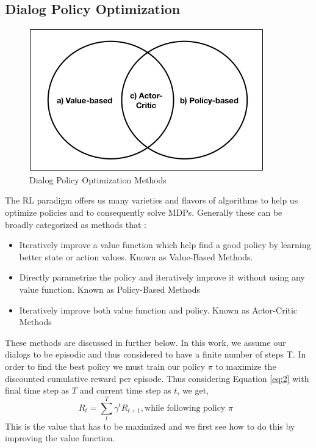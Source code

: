 \documentclass[14pt]{extarticle}
\numberwithin{equation}{section}
\begin{document}
		\subsection{Dialog Policy Optimization}
		\begin{figure}[H]
			\centering
			\includegraphics[scale=0.7]{mdp_methods}
			\caption{Dialog Policy Optimization Methods
				\label{mdp-methods}}
		\end{figure}
		The RL paradigm offers us many varieties and flavors of algorithms\cite{rl_overview} to help us optimize policies and to consequently solve MDPs. Generally these can be broadly categorized as methods that :
		\begin{itemize}
		\item Iteratively improve a value function which help find a good policy by learning better state or action values. Known as Value-Based Methods.
		\item Directly parametrize the policy and iteratively improve it without using any value function. Known as Policy-Based Methods
		\item Iteratively improve both value function and policy. Known as Actor-Critic Methods
		\end{itemize}
		These methods are discussed in further below. In this work, we assume our dialogs to be episodic and thus considered to have a finite number of steps T. In order to find the best policy we must train our policy $\pi$ to maximize the discounted cumulative reward per episode. Thus considering Equation \ref{eq:2} with final time step as $T$ and current time step as $t$, we get,
		\begin{equation}
		R_t =\sum_{t}^{T} { \gamma ^{t} R_{t+1}}, \text{while following policy $\pi$ } \nonumber
		\end{equation}
		This is the value that has to be maximized and we first see how to do this by improving the value function.
\end{document}
